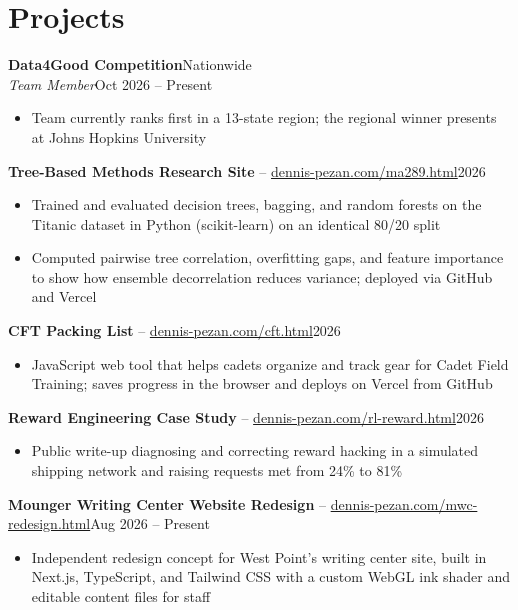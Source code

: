 \documentclass[10pt,letterpaper]{article}
\let\oldsection\section
\renewcommand{\section}{\needspace{7\baselineskip}\oldsection}
\newcommand{\entry}[4]{%
  \needspace{3\baselineskip}%
  \textbf{#1}\hfill #2\\
  \textit{#3}\hfill #4\par}
\newcommand{\proj}[4]{%
  \needspace{3\baselineskip}%
  \textbf{#1} -- \href{#3}{#2}\hfill #4\par}
\begin{document}
\section{Projects}
\entry{Data4Good Competition}{Nationwide}{Team Member}{Oct 2026 -- Present}
\begin{itemize}
  \item Team currently ranks first in a 13-state region; the regional winner presents at Johns Hopkins University
\end{itemize}
\proj{Tree-Based Methods Research Site}{dennis-pezan.com/ma289.html}{https://dennis-pezan.com/ma289.html}{2026}
\begin{itemize}
  \item Trained and evaluated decision trees, bagging, and random forests on the Titanic dataset in Python (scikit-learn) on an identical 80/20 split
  \item Computed pairwise tree correlation, overfitting gaps, and feature importance to show how ensemble decorrelation reduces variance; deployed via GitHub and Vercel
\end{itemize}
\proj{CFT Packing List}{dennis-pezan.com/cft.html}{https://dennis-pezan.com/cft.html}{2026}
\begin{itemize}
  \item JavaScript web tool that helps cadets organize and track gear for Cadet Field Training; saves progress in the browser and deploys on Vercel from GitHub
\end{itemize}
\proj{Reward Engineering Case Study}{dennis-pezan.com/rl-reward.html}{https://dennis-pezan.com/rl-reward.html}{2026}
\begin{itemize}
  \item Public write-up diagnosing and correcting reward hacking in a simulated shipping network and raising requests met from 24\% to 81\%
\end{itemize}
\proj{Mounger Writing Center Website Redesign}{dennis-pezan.com/mwc-redesign.html}{https://dennis-pezan.com/mwc-redesign.html}{Aug 2026 -- Present}
\begin{itemize}
  \item Independent redesign concept for West Point's writing center site, built in Next.js, TypeScript, and Tailwind CSS with a custom WebGL ink shader and editable content files for staff
\end{itemize}

\newpage %
\end{document}
